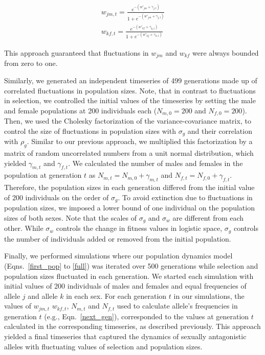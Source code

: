 \documentclass[12pt]{article}
\begin{document}
\begin{eqnarray}
  w_{jm,t}= \frac{e^{-(w'_{jm}+ \gamma_{j,t})}}{1+ e^{-(w'_{jm}+ \gamma_{j,t})}} \\
    w_{kf,t}= \frac{e^{-(w'_{kf}+ \gamma_{k,t})}}{1+ e^{-(w'_{kf}+ \gamma_{k,t})}}
\end{eqnarray}

This approach guaranteed that fluctuations in $w_{jm}$ and $w_{kf}$ were always bounded from zero to one.

Similarly, we generated an independent timeseries of 499 generations made up of correlated fluctuations in population sizes. Note, that in contrast to fluctuations in selection, we controlled the initial values of the timeseries by setting the male and female populations at 200 individuals each ($N_{m,0} =200$ and $N_{f,0} =200$). Then, we used the Cholesky factorization of the variance-covariance matrix, to control the size of fluctuations in population sizes with $\sigma_{g}$ and their correlation with $\rho_{g}$. Similar to our previous approach, we multiplied this factorization by a matrix of random uncorrelated numbers from a unit normal distribution, which yielded $\gamma_{m,t}$ and $\gamma_{f,t}$. We calculated the number of males and females in the population at generation $t$ as $N_{m,t} = N_{m,0} + \gamma_{m,t}$ and $N_{f,t} = N_{f,0}+ \gamma_{f,t} $. Therefore, the population sizes in each generation differed from the initial value of 200 individuals on the order of $\sigma_{g}$. To avoid extinction due to fluctuations in population sizes, we imposed a lower bound of one individual on the population sizes of both sexes. Note that the scales of $\sigma_{g}$ and  $\sigma_{w}$ are different from each other. While $\sigma_{w}$ controls the change in fitness values in logistic space, $\sigma_{g}$ controls the number of individuals added or removed from the initial population.



Finally, we performed simulations where our population dynamics model (Eqns.~\ref{first_pop} to \ref{full}) was iterated over 500 generations while selection and population sizes fluctuated in each generation. We started each simulation with initial values of 200 individuals of males and females and equal frequencies of allele $j$ and allele $k$ in each sex. For each generation $t$ in our simulations, the values of $w_{jm,t}$ $w_{kf,t}$, $N_{m,t}$ and $N_{f,t}$ used to calculate allele's frequencies in generation $t$ (e.g., Eqn.~\ref{next_gen}), corresponded to the values at generation $t$ calculated in the corresponding timeseries, as described previously. This approach yielded a final timeseries that captured the dynamics of sexually antagonistic alleles with fluctuating values of selection and population sizes.
\end{document}
